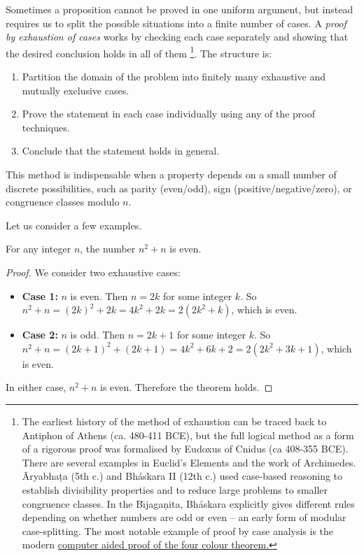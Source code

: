Sometimes a proposition cannot be proved in one uniform argument, but instead
requires us to split the possible situations into a finite number of cases.  
A \emph{proof by exhaustion of cases} works by checking each case separately and
showing that the desired conclusion holds in all of them \footnote{The earliest history of the method of exhaustion can be traced back to Antiphon of Athens (ca. 480-411 BCE), but the full logical method as a form of a rigorous proof was formalised by Eudoxus of Cnidus (ca 408-355 BCE). There are several examples in Euclid's Elements and the work of Archimedes. \={A}ryabha\d{t}a (5th c.) and Bh\'{a}skara II (12th c.) used case-based reasoning to establish divisibility properties and to reduce large problems to smaller congruence classes. In the B\={\i}jaga\d{n}ita,  Bh\'{a}skara explicitly gives different rules depending on whether numbers are odd or even -- an early form of modular case-splitting. The most notable example of proof by case analysis is the modern \href{https://en.wikipedia.org/wiki/Four\_color\_theorem}{computer aided proof of the four colour theorem.}}. The structure is:

\begin{enumerate}
    \item Partition the domain of the problem into finitely many exhaustive and
    mutually exclusive cases.
    \item Prove the statement in each case individually using any of the proof techniques.
    \item Conclude that the statement holds in general.
\end{enumerate}

This method is indispensable when a property depends on a small number of
discrete possibilities, such as parity (even/odd), sign (positive/negative/zero),
or congruence classes modulo $n$.

Let us consider a few examples.

\begin{theorem}
For any integer $n$, the number $n^2+n$ is even.
\end{theorem}

\begin{proof}
We consider two exhaustive cases:

\begin{itemize}
    \item \textbf{Case 1:} $n$ is even. Then $n = 2k$ for some integer $k$. 
    So $n^2+n = (2k)^2 + 2k = 4k^2+2k = 2(2k^2+k)$, which is even.
    \item \textbf{Case 2:} $n$ is odd. Then $n = 2k+1$ for some integer $k$. 
    So $n^2+n = (2k+1)^2 + (2k+1) = 4k^2+6k+2 = 2(2k^2+3k+1)$, which is even.
\end{itemize}

In either case, $n^2+n$ is even. Therefore the theorem holds.
\end{proof}

